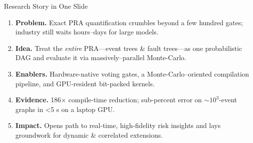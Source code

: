\begin{frame}[t]{Research Story in One Slide}
  \begin{enumerate}[<+->]
    \item \textbf{Problem.}  Exact PRA quantification crumbles beyond a few hundred gates; industry still waits hours–days for large models.
    \item \textbf{Idea.}  Treat the \emph{entire} PRA—event trees \& fault trees—as one probabilistic DAG and evaluate it via massively–parallel Monte-Carlo.
    \item \textbf{Enablers.}  Hardware-native voting gates, a Monte-Carlo–oriented compilation pipeline, and GPU-resident bit-packed kernels.
    \item \textbf{Evidence.}  186× compile-time reduction; sub-percent error on $\sim10^3$-event graphs in <5 s on a laptop GPU.
    \item \textbf{Impact.}  Opens path to real-time, high-fidelity risk insights and lays groundwork for dynamic \& correlated extensions.
  \end{enumerate}
\end{frame}